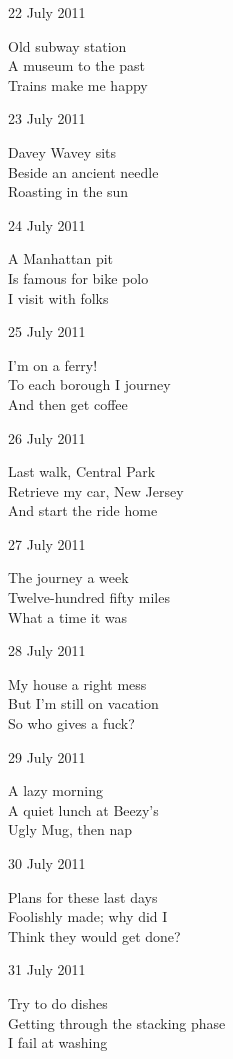 \documentclass[12pt]{article}
\begin{document}
22 July 2011

Old subway station \\
A museum to the past \\
Trains make me happy

\newpage

23 July 2011

Davey Wavey sits \\
Beside an ancient needle \\
Roasting in the sun

24 July 2011

A Manhattan pit \\
Is famous for bike polo \\
I visit with folks

25 July 2011

I'm on a ferry! \\
To each borough I journey \\
And then get coffee

26 July 2011

Last walk, Central Park \\
Retrieve my car, New Jersey \\
And start the ride home

27 July 2011

The journey a week \\
Twelve-hundred fifty miles \\
What a time it was

28 July 2011

My house a right mess \\
But I'm still on vacation \\
So who gives a fuck?

29 July 2011

A lazy morning \\
A quiet lunch at Beezy's \\
Ugly Mug, then nap

\newpage

30 July 2011

Plans for these last days \\
Foolishly made; why did I \\
Think they would get done?

31 July 2011

Try to do dishes \\
Getting through the stacking phase \\
I fail at washing


\vfill
\end{document}
